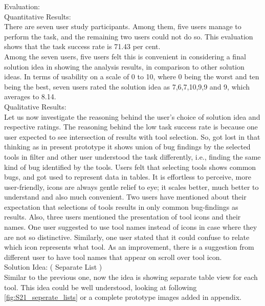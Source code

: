Evaluation: \\

Quantitative Results: \\

There are seven user study participants. Among them, five users manage to perform the task, and the remaining two users could not do so. This evaluation shows that the task success rate is 71.43 per cent. \\

Among the seven users, five users felt this is convenient in considering a final solution idea in showing the analysis results, in comparison to other solution ideas. In terms of usability on a scale of 0 to 10, where 0 being the worst and ten being the best, seven users rated the solution idea as 7,6,7,10,9,9 and 9, which averages to 8.14. \\

Qualitative Results: \\

Let us now investigate the reasoning behind the user’s choice of solution idea and respective ratings. The reasoning behind the low task success rate is because one user expected to see intersection of results with tool selection. So, got lost in that thinking as in present prototype it shows union of bug findings by the selected tools in filter and other user understood the task differently, i.e., finding the same kind of bug identified by the tools.  Users felt that selecting tools shows common bugs, and got used to represent data in tables. It is effortless to perceive, more user-friendly, icons are always gentle relief to eye; it scales better, much better to understand and also much convenient. Two users have mentioned about their expectation that selections of tools results in only common bug-findings as results. Also, three users mentioned the presentation of tool icons and their names. One user suggested to use tool names instead of icons in case where they are not so distinctive. Similarly, one user stated that it could confuse to relate which icon represents what tool. As an improvement, there is a suggestion from different user to have tool names that appear on scroll over tool icon. \\

Solution Idea: ( Separate List ) \\

Similar to the previous one, now the idea is showing separate table view for each tool. This idea could be well understood, looking at following \autoref{fig:S21_seperate_lists} or a complete prototype images added in appendix.  \\

